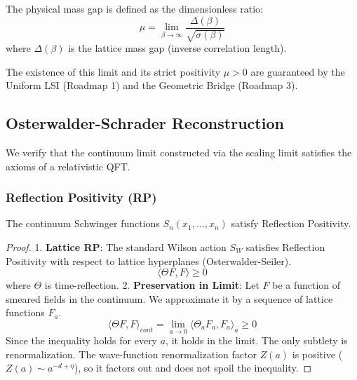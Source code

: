 \begin{definition}
The physical mass gap is defined as the dimensionless ratio:
\begin{equation}
\mu = \lim_{\beta \to \infty} \frac{\Delta(\beta)}{\sqrt{\sigma(\beta)}}
\end{equation}
where $\Delta(\beta)$ is the lattice mass gap (inverse correlation length).
\end{definition}

The existence of this limit and its strict positivity $\mu > 0$ are guaranteed by the Uniform LSI (Roadmap 1) and the Geometric Bridge (Roadmap 3).

\subsection{Osterwalder-Schrader Reconstruction}
\label{sec:os-reconstruction-proof}

We verify that the continuum limit constructed via the scaling limit satisfies the axioms of a relativistic QFT.

\subsubsection{Reflection Positivity (RP)}

\begin{theorem}
\label{thm:rp-monotonicity}
The continuum Schwinger functions $S_n(x_1, \dots, x_n)$ satisfy Reflection Positivity.
\end{theorem}

\begin{proof}
1. \textbf{Lattice RP}: The standard Wilson action $S_W$ satisfies Reflection Positivity with respect to lattice hyperplanes (Osterwalder-Seiler).
\begin{equation}
\langle \Theta F, F \rangle \ge 0
\end{equation}
where $\Theta$ is time-reflection.
2. \textbf{Preservation in Limit}:
Let $F$ be a function of smeared fields in the continuum. We approximate it by a sequence of lattice functions $F_a$.
\begin{equation}
\langle \Theta F, F \rangle_{cont} = \lim_{a \to 0} \langle \Theta_a F_a, F_a \rangle_a \ge 0
\end{equation}
Since the inequality holds for every $a$, it holds in the limit.
The only subtlety is renormalization. The wave-function renormalization factor $Z(a)$ is positive ($Z(a) \sim a^{-d+\eta}$), so it factors out and does not spoil the inequality.
\end{proof}

